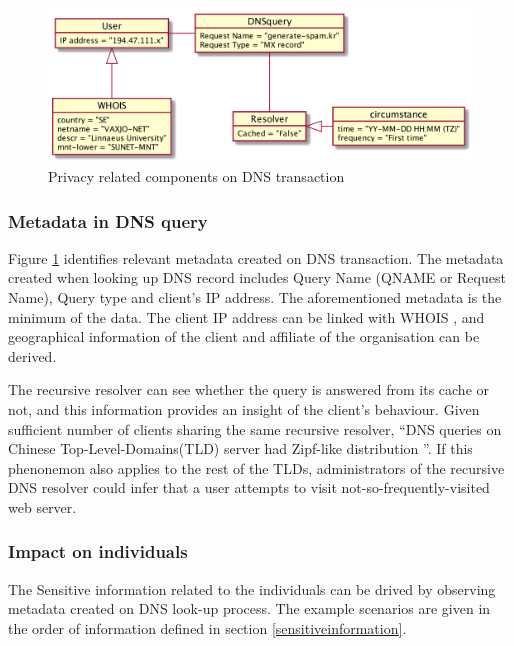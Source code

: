 \begin{figure}[ht!]
    \begin{center}
        \includegraphics*[width=\columnwidth]{img/privacyobject}
    \end{center}
    \caption{Privacy related components on DNS transaction}
    \label{privacyobject}
\end{figure}

\subsubsection{Metadata in DNS query}\label{dnsmetadata}
Figure \ref{privacyobject} identifies relevant metadata created on DNS transaction.
The metadata created when looking up DNS record includes Query Name (QNAME or Request Name), Query type and client's IP address.
The aforementioned metadata is the minimum of the data. The client IP address can be linked with WHOIS \cite{whois-icann}, and geographical information of the client and affiliate of the organisation can be derived.

The recursive resolver can see whether the query is answered from its cache or not, and this information provides an insight of the client's behaviour.
Given sufficient number of clients sharing the same recursive resolver, ``DNS queries on Chinese Top-Level-Domains(TLD) server had Zipf-like distribution \cite{wang2013analysis}''. If this phenonemon also applies to the rest of the TLDs, administrators of the recursive DNS resolver could infer that a user attempts to visit not-so-frequently-visited web server.

\subsubsection{Impact on individuals}
The Sensitive information related to the individuals can be drived by observing metadata created on DNS look-up process. The example scenarios are given in the order of information defined in section \ref{sensitiveinformation}.

